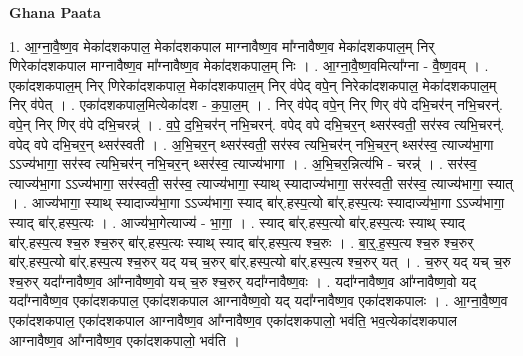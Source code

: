 \documentclass[17pt]{extarticle}
\begin{document}
\textbf{Ghana Paata } \newline

1. आ॒ग्ना॒वै॒ष्ण॒व मेका॑दशकपाल॒ मेका॑दशकपाल माग्नावैष्ण॒व मा᳚ग्नावैष्ण॒व मेका॑दशकपाल॒म् निर् णिरेका॑दशकपाल माग्नावैष्ण॒व मा᳚ग्नावैष्ण॒व मेका॑दशकपाल॒म् निः । . आ॒ग्ना॒वै॒ष्ण॒वमित्या᳚ग्ना - वै॒ष्ण॒वम् । . एका॑दशकपाल॒म् निर् णिरेका॑दशकपाल॒ मेका॑दशकपाल॒म् निर् व॑पेद् वपे॒न् निरेका॑दशकपाल॒ मेका॑दशकपाल॒म् निर् व॑पेत् । . एका॑दशकपाल॒मित्येका॑दश - क॒पा॒ल॒म् । . निर् व॑पेद् वपे॒न् निर् णिर् व॑पे दभि॒चर॑न् नभि॒चरन्॑. वपे॒न् निर् णिर् व॑पे दभि॒चरन्न्॑ । . व॒पे॒ द॒भि॒चर॑न् नभि॒चरन्॑. वपेद् वपे दभि॒चर॒न् थ्सर॑स्वती॒ सर॑स्व त्यभि॒चरन्॑. वपेद् वपे दभि॒चर॒न् थ्सर॑स्वती । . अ॒भि॒चर॒न् थ्सर॑स्वती॒ सर॑स्व त्यभि॒चर॑न् नभि॒चर॒न् थ्सर॑स्व॒ त्याज्य॑भा॒गा ऽऽज्य॑भागा॒ सर॑स्व त्यभि॒चर॑न् नभि॒चर॒न् थ्सर॑स्व॒ त्याज्य॑भागा । . अ॒भि॒चर॒न्नित्य॑भि - चरन्न्॑ । . सर॑स्व॒ त्याज्य॑भा॒गा ऽऽज्य॑भागा॒ सर॑स्वती॒ सर॑स्व॒ त्याज्य॑भागा॒ स्याथ् स्यादाज्य॑भागा॒ सर॑स्वती॒ सर॑स्व॒ त्याज्य॑भागा॒ स्यात् । . आज्य॑भागा॒ स्याथ् स्यादाज्य॑भा॒गा ऽऽज्य॑भागा॒ स्याद् बा॑र्.हस्प॒त्यो बा॑र्.हस्प॒त्यः स्यादाज्य॑भा॒गा ऽऽज्य॑भागा॒ स्याद् बा॑र्.हस्प॒त्यः । . आज्य॑भा॒गेत्याज्य॑ - भा॒गा॒ । . स्याद् बा॑र्.हस्प॒त्यो बा॑र्.हस्प॒त्यः स्याथ् स्याद् बा॑र्.हस्प॒त्य श्च॒रु श्च॒रुर् बा॑र्.हस्प॒त्यः स्याथ् स्याद् बा॑र्.हस्प॒त्य श्च॒रुः । . बा॒र्॒.ह॒स्प॒त्य श्च॒रु श्च॒रुर् बा॑र्.हस्प॒त्यो बा॑र्.हस्प॒त्य श्च॒रुर् यद् यच् च॒रुर् बा॑र्.हस्प॒त्यो बा॑र्.हस्प॒त्य श्च॒रुर् यत् । . च॒रुर् यद् यच् च॒रु श्च॒रुर् यदा᳚ग्नावैष्ण॒व आ᳚ग्नावैष्ण॒वो यच् च॒रु श्च॒रुर् यदा᳚ग्नावैष्ण॒वः । . यदा᳚ग्नावैष्ण॒व आ᳚ग्नावैष्ण॒वो यद् यदा᳚ग्नावैष्ण॒व एका॑दशकपाल॒ एका॑दशकपाल आग्नावैष्ण॒वो यद् यदा᳚ग्नावैष्ण॒व एका॑दशकपालः । . आ॒ग्ना॒वै॒ष्ण॒व एका॑दशकपाल॒ एका॑दशकपाल आग्नावैष्ण॒व आ᳚ग्नावैष्ण॒व एका॑दशकपालो॒ भव॑ति॒ भव॒त्येका॑दशकपाल आग्नावैष्ण॒व आ᳚ग्नावैष्ण॒व एका॑दशकपालो॒ भव॑ति । \newline
\end{document}
